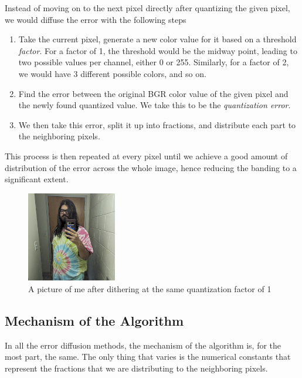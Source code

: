 \documentclass{article}
\begin{document}
\noindent Instead of moving on to the next pixel directly after quantizing the given pixel, we would diffuse the error with the following steps\cite{guilloteau:hal}

\begin{enumerate}
    \item Take the current pixel, generate a new color value for it based on a threshold \textit{factor}. For a factor of 1, the threshold would be the midway point, leading to two possible values per channel, either 0 or 255. Similarly, for a factor of 2, we would have 3 different possible colors, and so on.

    \item Find the error between the original BGR color value of the given pixel and the newly found quantized value. We take this to be the \textit{quantization error}.

    \item We then take this error, split it up into fractions, and distribute each part to the neighboring pixels.
\end{enumerate}

\noindent This process is then repeated at every pixel until we achieve a good amount of distribution of the error across the whole image, hence reducing the banding to a significant extent.

\begin{figure}[H]
    \centering
    \includegraphics[width=0.35\textwidth]{images/dithered_me.jpg}
    \caption{A picture of me after dithering at the same quantization factor of 1}
    \label{fig:me_dithered}
\end{figure}

\subsection{Mechanism of the Algorithm}\label{Floyd-Steinberg Mechanism}

\noindent In all the error diffusion methods, the mechanism of the algorithm is, for the most part, the same. The only thing that varies is the numerical constants that represent the fractions that we are distributing to the neighboring pixels\cite{guilloteau:hal}.
\end{document}

